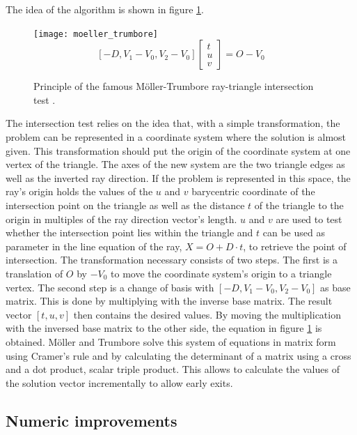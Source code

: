 The idea of the algorithm is shown in figure \ref{fig:ray_triangle_intersect}.
%
\begin{figure}
	\centering
	\texttt{[image: moeller\_trumbore]}
	\begin{equation*}
		\left[-D, V_1 - V_0, V_2 - V_0 \right] \left[ \begin{array}{c} t \\ u \\ v \end{array} \right] = O - V_0
	\end{equation*}
	\caption{
		Principle of the famous Möller-Trumbore ray-triangle intersection test \cite{enlight_demo_workshop}.
	}
	\label{fig:ray_triangle_intersect}
\end{figure}
%
The intersection test relies on the idea that, with a simple transformation, the problem can be represented in a coordinate system where the solution is almost given.
This transformation should put the origin of the coordinate system at one vertex of the triangle.
The axes of the new system are the two triangle edges as well as the inverted ray direction.
If the problem is represented in this space, the ray's origin holds the values of the $u$ and $v$ barycentric coordinate of the intersection point on the triangle as well as the distance $t$ of the triangle to the origin in multiples of the ray direction vector's length.
$u$ and $v$ are used to test whether the intersection point lies within the triangle and $t$ can be used as parameter in the line equation of the ray, $X = O + D \cdot t$, to retrieve the point of intersection.
The transformation necessary consists of two steps.
The first is a translation of $O$ by $-V_0$ to move the coordinate system's origin to a triangle vertex.
The second step is a change of basis with $\left[-D, V_1 - V_0, V_2 - V_0 \right]$ as base matrix.
This is done by multiplying with the inverse base matrix.
The result vector $\left[ t,  u,  v \right]$ then contains the desired values.
By moving the multiplication with the inversed base matrix to the other side, the equation in figure \ref{fig:ray_triangle_intersect} is obtained.
Möller and Trumbore solve this system of equations in matrix form using Cramer's rule and by calculating the determinant of a matrix using a cross and a dot product, \aka scalar triple product.
This allows to calculate the values of the solution vector incrementally to allow early exits.


\subsection{Numeric improvements}
\label{sec:numeric_improvements}

